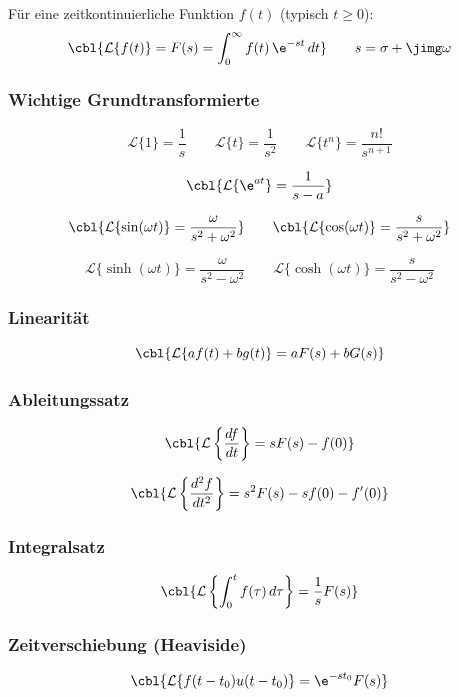 Für eine zeitkontinuierliche Funktion $f(t)$ (typisch $t\ge 0$):
\[
\cbl{\mathcal{L}\{f(t)\} = F(s) = \int_{0}^{\infty} f(t)\, \e^{-st}\,dt}
\qquad
s = \sigma + \jimg \omega
\]

\subsubsection{Wichtige Grundtransformierte}

\[
\mathcal{L}\{1\} = \frac{1}{s}
\qquad
\mathcal{L}\{t\} = \frac{1}{s^2}
\qquad
\mathcal{L}\{t^n\} = \frac{n!}{s^{n+1}}
\]

\[
\cbl{\mathcal{L}\{\e^{at}\} = \frac{1}{s-a}}
\]

\[
\cbl{\mathcal{L}\{\sin(\omega t)\} = \frac{\omega}{s^2+\omega^2}}
\qquad
\cbl{\mathcal{L}\{\cos(\omega t)\} = \frac{s}{s^2+\omega^2}}
\]

\[
\mathcal{L}\{\sinh(\omega t)\} = \frac{\omega}{s^2-\omega^2}
\qquad
\mathcal{L}\{\cosh(\omega t)\} = \frac{s}{s^2-\omega^2}
\]

\subsubsection{Linearität}

\[
\cbl{\mathcal{L}\{a f(t) + b g(t)\} = aF(s) + bG(s)}
\]

\subsubsection{Ableitungssatz}

\[
\cbl{\mathcal{L}\left\{\frac{df}{dt}\right\} = sF(s) - f(0)}
\]

\[
\cbl{\mathcal{L}\left\{\frac{d^2f}{dt^2}\right\} = s^2F(s) - s f(0) - f'(0)}
\]


\subsubsection{Integralsatz}

\[
\cbl{\mathcal{L}\left\{\int_0^t f(\tau)\,d\tau\right\} = \frac{1}{s} F(s)}
\]

\subsubsection{Zeitverschiebung (Heaviside)}

\[
\cbl{\mathcal{L}\{f(t-t_0)u(t-t_0)\} = \e^{-s t_0} F(s)}
\]

